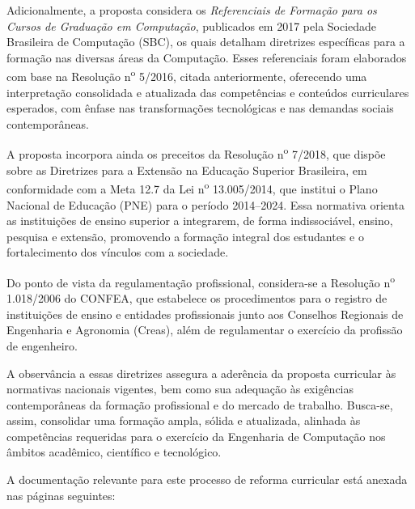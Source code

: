 Adicionalmente, a proposta considera os \textit{Referenciais de Formação para os Cursos de Graduação em Computação}, publicados em 2017 pela Sociedade Brasileira de Computação (SBC), os quais detalham diretrizes específicas para a formação nas diversas áreas da Computação. Esses referenciais foram elaborados com base na Resolução n\textsuperscript{o} 5/2016, citada anteriormente, oferecendo uma interpretação consolidada e atualizada das competências e conteúdos curriculares esperados, com ênfase nas transformações tecnológicas e nas demandas sociais contemporâneas.

A proposta incorpora ainda os preceitos da Resolução n\textsuperscript{o} 7/2018, que dispõe sobre as Diretrizes para a Extensão na Educação Superior Brasileira, em conformidade com a Meta 12.7 da Lei n\textsuperscript{o} 13.005/2014, que institui o Plano Nacional de Educação (PNE) para o período 2014--2024. Essa normativa orienta as instituições de ensino superior a integrarem, de forma indissociável, ensino, pesquisa e extensão, promovendo a formação integral dos estudantes e o fortalecimento dos vínculos com a sociedade.

Do ponto de vista da regulamentação profissional, considera-se a Resolução n\textsuperscript{o} 1.018/2006 do CONFEA, que estabelece os procedimentos para o registro de instituições de ensino e entidades profissionais junto aos Conselhos Regionais de Engenharia e Agronomia (Creas), além de regulamentar o exercício da profissão de engenheiro.

A observância a essas diretrizes assegura a aderência da proposta curricular às normativas nacionais vigentes, bem como sua adequação às exigências contemporâneas da formação profissional e do mercado de trabalho. Busca-se, assim, consolidar uma formação ampla, sólida e atualizada, alinhada às competências requeridas para o exercício da Engenharia de Computação nos âmbitos acadêmico, científico e tecnológico.

A documentação relevante para este processo de reforma curricular está anexada nas páginas seguintes:

